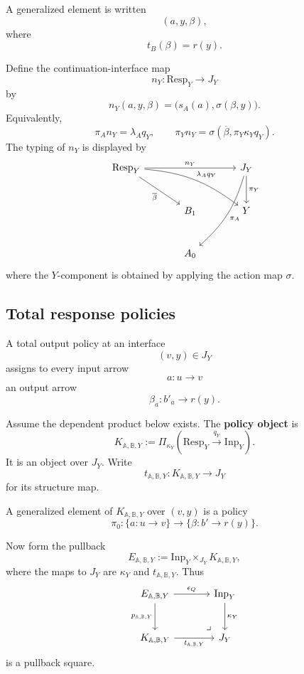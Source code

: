 A generalized element is written
\[
(a,y,\beta),
\]
where
\[
t_B(\beta)=r(y).
\]

Define the continuation-interface map
\[
n_Y:\mathrm{Resp}_Y\to J_Y
\]
by
\[
n_Y(a,y,\beta)
=
\bigl(
s_A(a),
\sigma(\beta,y)
\bigr).
\]
Equivalently,
\[
\pi_A n_Y=\lambda_A q_Y,
\qquad
\pi_Y n_Y=\sigma(\overline\beta,\pi_Y\kappa_Yq_Y).
\]
The typing of \(n_Y\) is displayed by
\[
\begin{tikzcd}[column sep=large,row sep=large]
\mathrm{Resp}_Y
  \arrow[rr,"n_Y"]
  \arrow[drr,bend left=16,"\lambda_Aq_Y"]
  \arrow[dr,"\overline\beta"']
&&
J_Y
  \arrow[d,"\pi_Y"]
  \arrow[ddl,bend left=16,"\pi_A"]
\\
&
B_1
&
Y
\\
&
A_0
&
\end{tikzcd}
\]
where the \(Y\)-component is obtained by applying the action map \(\sigma\).

\subsection{Total response policies}
\label{subsec:poly-relative-total-policies}

A total output policy at an interface
\[
(v,y)\in J_Y
\]
assigns to every input arrow
\[
a:u\to v
\]
an output arrow
\[
\beta_a:b'_a\to r(y).
\]

\begin{definition}
\label{def:poly-relative-policy-object}
Assume the dependent product below exists.  The \textbf{policy object} is
\[
K_{\mathbb A,\mathbb B,Y}
:=
\Pi_{\kappa_Y}(\mathrm{Resp}_Y\xrightarrow{q_Y}\mathrm{Inp}_Y).
\]
It is an object over \(J_Y\).  Write
\[
t_{\mathbb A,\mathbb B,Y}:
K_{\mathbb A,\mathbb B,Y}\to J_Y
\]
for its structure map.
\end{definition}

A generalized element of \(K_{\mathbb A,\mathbb B,Y}\) over \((v,y)\) is a
policy
\[
\pi_0:
\{a:u\to v\}
\to
\{\beta:b'\to r(y)\}.
\]

Now form the pullback
\[
E_{\mathbb A,\mathbb B,Y}
:=
\mathrm{Inp}_Y\times_{J_Y}K_{\mathbb A,\mathbb B,Y},
\]
where the maps to \(J_Y\) are \(\kappa_Y\) and
\(t_{\mathbb A,\mathbb B,Y}\).  Thus
\[
\begin{tikzcd}[column sep=large,row sep=large]
E_{\mathbb A,\mathbb B,Y}
  \arrow[r,"\epsilon_Q"]
  \arrow[d,"p_{\mathbb A,\mathbb B,Y}"']
&
\mathrm{Inp}_Y
  \arrow[d,"\kappa_Y"]
\\
K_{\mathbb A,\mathbb B,Y}
  \arrow[r,"t_{\mathbb A,\mathbb B,Y}"']
&
J_Y
\arrow[ul,phantom,very near start,"\lrcorner"]
\end{tikzcd}
\]
is a pullback square.

